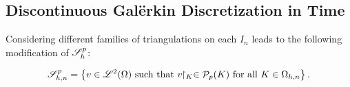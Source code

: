 \newpage
\subsection{Discontinuous Galërkin Discretization in Time}

Considering different families of triangulations on each $I_n$ leads to the following modification of $\mathscr{S}_h^p$:
\begin{definition}[$\SpaceSolution_{h, n}^p$]
    \begin{align}
        \mathscr{S}_{h, n}^p = \left\{ v \in \mathscr{L}^{2}(\Omega) \text{ such that } v \!\!\restriction_{K} \in \mathcal{P}_{p}(K) \text{ for all } K \in \Omega_{h, n} \right\}.
    \end{align}
\end{definition}

